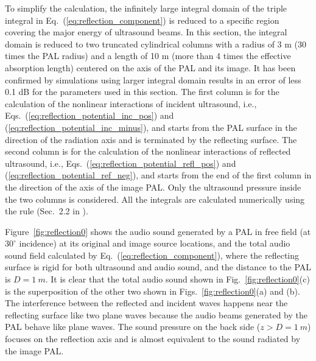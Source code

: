 To simplify the calculation, the infinitely large integral domain of the triple integral in Eq.~(\ref{eq:reflection_component}) is reduced to a specific region covering the major energy of ultrasound beams. %
In this section, the integral domain is reduced to two truncated cylindrical columns with a radius of 3 m (30 times the PAL radius) and a length of 10 m (more than 4 times the effective absorption length) centered on the axis of the PAL and its image. 
    It has been confirmed by simulations using larger integral domain results in an error  of less 0.1 dB for the parameters used in this section.
The first column is for the calculation of the nonlinear interactions of incident ultrasound, i.e., Eqs.~(\ref{eq:reflection_potential_inc_pos}) and (\ref{eq:reflection_potential_inc_minus}), and starts from the PAL surface in the direction of the radiation axis and is terminated by the reflecting surface. 
The second column is for the calculation of the nonlinear interactions of reflected ultrasound, i.e., Eqs.~(\ref{eq:reflection_potential_refl_pos}) and (\ref{eq:reflection_potential_ref_neg}), and starts from the end of the first column in the direction of the axis of the image PAL. 
Only the ultrasound pressure inside the two columns is considered. 
All the integrals are calculated numerically using the  rule (Sec.~2.2 in \cite{Davis1984MethodsNumericalIntegration}).

Figure~\ref{fig:reflection0} shows the audio sound generated by a PAL in free field (at $30^\circ$ incidence) at its original and image source locations, 
and the total audio sound field calculated by Eq.~(\ref{eq:reflection_component}), 
where the reflecting surface is rigid for both ultrasound and audio sound, 
and the distance to the PAL is $D = \SI{1}{m}$. 
It is clear that the total audio sound shown in Fig.~\ref{fig:reflection0}(c) is the superposition of the other two shown in Figs.~\ref{fig:reflection0}(a) and (b). 
The interference between the reflected and incident waves happens near the reflecting surface like two plane waves because the audio beams generated by the PAL behave like plane waves. 
The sound pressure on the back side ($z > D = \SI{1}{m}$) focuses on the reflection axis and is almost equivalent to the sound radiated by the image PAL.

